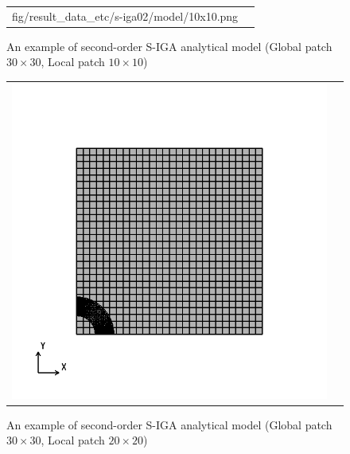 \begin{figure}[htbp]
\begin{tabular}{cc}
\begin{minipage}[t]{0.45\hsize}
      {fig/result_data_etc/s-iga02/model/10x10.png}
      \caption{An example of second-order S-IGA analytical model (Global patch $30\times 30$, Local patch $10\times 10$)}
      \label{fig:s-iga02 model02}
    \end{minipage}
  \end{tabular}
\end{figure}

\newpage

\begin{figure}[hbtp]
  \begin{tabular}{cc}
    \begin{minipage}[t]{0.45\hsize}
      \centering
      \includegraphics[keepaspectratio, scale=0.3]
      {fig/result_data_etc/s-iga02/model/20x20.png}
      \caption{An example of second-order S-IGA analytical model (Global patch $30\times 30$, Local patch $20\times 20$)}
      \label{fig:s-iga02 model03}
    \end{minipage} &
    \begin{minipage}[t]{0.45\hsize}
      \centering

\end{minipage}
\end{tabular}
\end{figure}
